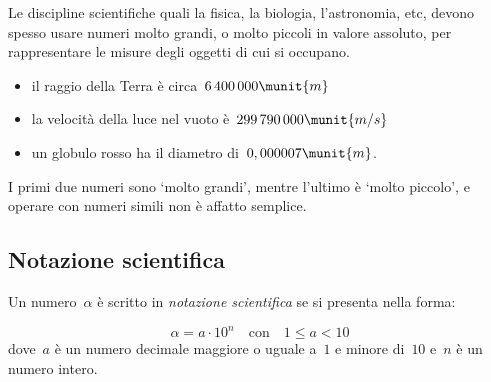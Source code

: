 Le discipline scientifiche quali la fisica, la biologia, l'astronomia, etc,
devono spesso usare numeri molto grandi, o molto piccoli in valore assoluto, 
per rappresentare le misure degli oggetti di cui si occupano.


\begin{itemize} [nosep]
\item il raggio della Terra è circa~\(6\,400\,000\munit{m}\)
\item la velocità della luce nel vuoto è~\(299\,790\,000\munit{m/s}\)
\item un globulo rosso ha il diametro di~\(0,000007\munit{m}\).
\end{itemize}

I primi due numeri sono `molto grandi', mentre l'ultimo è `molto piccolo', e 
operare con numeri simili non è affatto semplice.

\subsection{Notazione scientifica}
\begin{definizione}{}{}
Un numero~\(\alpha\) è scritto in \emph{notazione scientifica} se
si presenta nella forma:

\vspace{-1em}
\[\alpha = a\cdot 10^n \quad \text{con} \quad 1 \leqslant a < 10\] 
dove~\(a\) è un numero decimale maggiore o uguale a~\(1\) e minore di~\(10\) 
e~\(n\) è un numero intero.
\end{definizione}

% 

